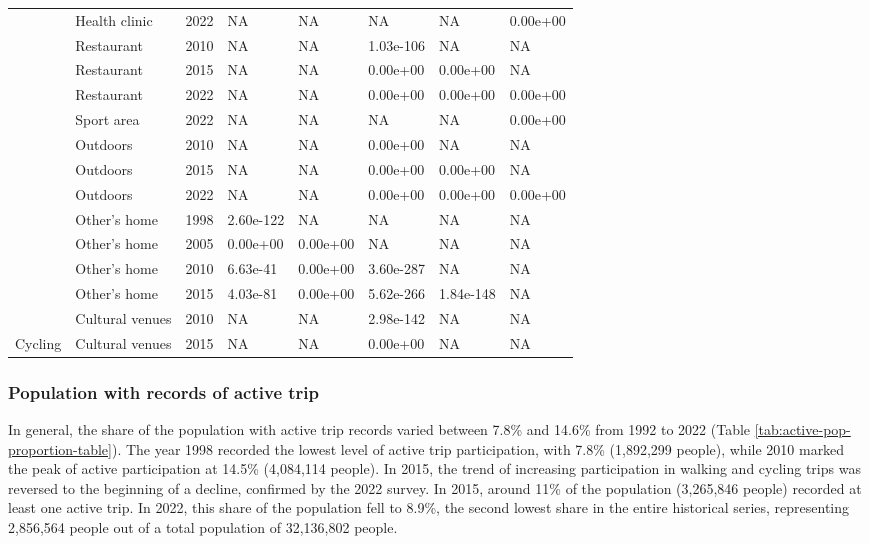 \documentclass[preprint, 3p,
authoryear]{elsarticle} %
\begin{document}
\begin{table}
{\begin{tabular}[t]{llllllll}
 & Health clinic & 2022 & NA & NA & NA & NA & 0.00e+00\\

 & Restaurant & 2010 & NA & NA & 1.03e-106 & NA & NA\\

 & Restaurant & 2015 & NA & NA & 0.00e+00 & 0.00e+00 & NA\\

 & Restaurant & 2022 & NA & NA & 0.00e+00 & 0.00e+00 & 0.00e+00\\

 & Sport area & 2022 & NA & NA & NA & NA & 0.00e+00\\

 & Outdoors & 2010 & NA & NA & 0.00e+00 & NA & NA\\

 & Outdoors & 2015 & NA & NA & 0.00e+00 & 0.00e+00 & NA\\

 & Outdoors & 2022 & NA & NA & 0.00e+00 & 0.00e+00 & 0.00e+00\\

 & Other's home & 1998 & 2.60e-122 & NA & NA & NA & NA\\

 & Other's home & 2005 & 0.00e+00 & 0.00e+00 & NA & NA & NA\\

 & Other's home & 2010 & 6.63e-41 & 0.00e+00 & 3.60e-287 & NA & NA\\

 & Other's home & 2015 & 4.03e-81 & 0.00e+00 & 5.62e-266 & 1.84e-148 & NA\\

 & Cultural venues & 2010 & NA & NA & 2.98e-142 & NA & NA\\

\multirow[t]{-27}{*}{\raggedright\arraybackslash Cycling} & Cultural venues & 2015 & NA & NA & 0.00e+00 & NA & NA\\
\bottomrule
\end{tabular}}
\end{table}

\subsubsection{Population with records of active
trip}\label{population-with-records-of-active-trip}

In general, the share of the population with active trip records varied
between 7.8\% and 14.6\% from 1992 to 2022 (Table
\ref{tab:active-pop-proportion-table}). The year 1998 recorded the
lowest level of active trip participation, with 7.8\% (1,892,299
people), while 2010 marked the peak of active participation at 14.5\%
(4,084,114 people). In 2015, the trend of increasing participation in
walking and cycling trips was reversed to the beginning of a decline,
confirmed by the 2022 survey. In 2015, around 11\% of the population
(3,265,846 people) recorded at least one active trip. In 2022, this
share of the population fell to 8.9\%, the second lowest share in the
entire historical series, representing 2,856,564 people out of a total
population of 32,136,802 people.
\end{document}
